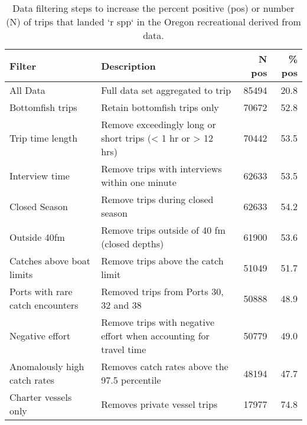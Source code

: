 
\begin{longtable}[t]{l>{\raggedright\arraybackslash}p{6cm}rr}
\caption{\label{tab:cpue-recreationalOregon-filter}Data filtering steps to increase the percent positive (pos) or number (N) of trips that landed `r spp` in the Oregon recreational  derived from  data.}\\
\toprule
Filter & Description & N pos & \% pos\\
\midrule
All Data & Full data set aggregated to trip & 85494 & 20.8\\
Bottomfish trips & Retain bottomfish trips only & 70672 & 52.8\\
Trip time length & Remove exceedingly long or short trips (< 1 hr or > 12 hrs) & 70442 & 53.5\\
Interview time & Remove trips with interviews within one minute & 62633 & 53.5\\
Closed Season & Remove trips during closed season & 62633 & 54.2\\
\addlinespace
Outside 40fm & Remove trips outside of 40 fm (closed depths) & 61900 & 53.6\\
Catches above boat limits & Remove trips above the catch limit & 51049 & 51.7\\
Ports with rare catch encounters & Removed trips from Ports 30, 32 and 38 & 50888 & 48.9\\
Negative effort & Remove trips with negative effort when accounting for travel time & 50779 & 49.0\\
Anomalously high catch rates & Removes catch rates above the 97.5 percentile & 48194 & 47.7\\
\addlinespace
Charter vessels only & Removes private vessel trips & 17977 & 74.8\\
\bottomrule
\end{longtable}
